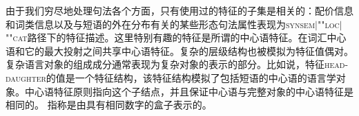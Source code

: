由于我们穷尽地处理句法各个方面，只有使用过的特征的子集是相关的：配价信息和词类信息以及与短语的外在分布有关的某些形态句法属性表现为\textsc{synsem$|$""loc$|$""cat}路径下的特征描述。这里特别有趣的特征是所谓的中心语特征。在词汇中心语和它的最大投射之间共享中心语特征。复杂的层级结构也被模拟为特征值偶对。复杂语言对象的组成成分通常表现为复杂对象的表示的部分。比如说，特征\textsc{head-daughter}的值是一个特征结构，该特征结构模拟了包括短语的中心语的语言学对象。中心语特征原则指向这个子结点，并且保证中心语与完整对象的中心语特征是相同的。
\ea
{} \impl
{} 
\z
指称是由具有相同数字的盒子表示的。

